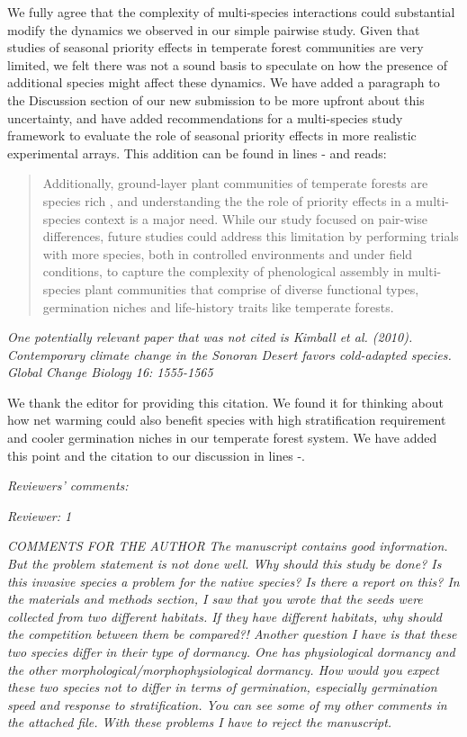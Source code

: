 \documentclass[11pt]{article}
\begin{document}
We fully agree that the complexity of multi-species interactions could substantial modify the dynamics we observed in our simple pairwise study. Given that studies of seasonal priority effects in temperate forest communities are very limited, we felt there was not a sound basis to speculate on how the presence of additional species might affect these dynamics. We have added a paragraph to the Discussion section of our new submission to be more upfront about this uncertainty, and have added recommendations for a multi-species study framework to evaluate the role of seasonal priority effects in more realistic experimental arrays. This addition can be found in lines - and reads:

\begin{quote}Additionally, ground-layer plant communities of temperate forests are species rich \citep{Whigham:2004wy}, and understanding the the role of priority effects in a multi-species context is a major need. While our study focused on pair-wise differences, future studies could address this limitation by performing trials with more species, both in controlled environments and under field conditions, to capture the complexity of phenological assembly in multi-species plant communities that comprise of diverse functional types, germination niches and life-history traits like temperate forests.\end{quote}

\emph{One potentially relevant paper that was not cited is Kimball et al. (2010). Contemporary climate change in the Sonoran Desert favors cold-adapted species. Global Change Biology 16: 1555-1565}

We thank the editor for providing this citation. We found it for thinking about how net warming could also benefit species with high stratification requirement and cooler germination niches in our temperate forest system. We have added this point and the citation to our discussion in lines -.

\emph{Reviewers’ comments:}

\emph{Reviewer: 1}

\emph{COMMENTS FOR THE AUTHOR}
\emph{The manuscript contains good information. But the problem statement is not done well. Why should this study be done? Is this invasive species a problem for the native species? Is there a report on this? In the materials and methods section, I saw that you wrote that the seeds were collected from two different habitats. If they have different habitats, why should the competition between them be compared?! Another question I have is that these two species differ in their type of dormancy. One has physiological dormancy and the other morphological/morphophysiological dormancy. How would you expect these two species not to differ in terms of germination, especially germination speed and response to stratification. You can see some of my other comments in the attached file. With these problems I have to reject the manuscript.}
\end{document}
